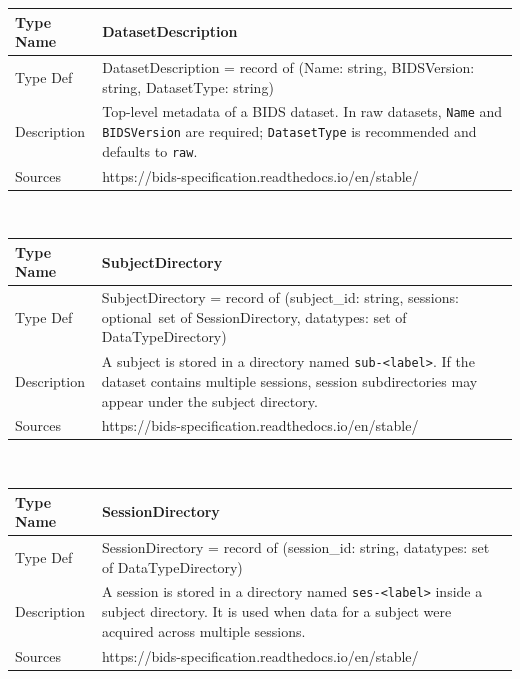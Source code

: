 \documentclass[12pt]{article}
\newcommand{\colAwidth}{0.13\textwidth}
\newcommand{\colBwidth}{0.82\textwidth}
\begin{document}
\noindent
\begin{minipage}{\textwidth}
\renewcommand*{\arraystretch}{1.5}
\begin{tabular}{| p{\colAwidth} | p{\colBwidth}|}
  \hline
  \rowcolor[gray]{0.9}
  Type Name & DatasetDescription\\
  \hline
  Type Def & DatasetDescription = record of (Name: string, BIDSVersion: string, DatasetType: string)\\
  \hline
  Description & Top-level metadata of a BIDS dataset. In raw datasets, \texttt{Name} and \texttt{BIDSVersion} are required; \texttt{DatasetType} is recommended and defaults to \texttt{raw}.\\
  \hline
  Sources & https://bids-specification.readthedocs.io/en/stable/\\
  \hline
\end{tabular}
\end{minipage}\\

\noindent
\begin{minipage}{\textwidth}
\renewcommand*{\arraystretch}{1.5}
\begin{tabular}{| p{\colAwidth} | p{\colBwidth}|}
  \hline
  \rowcolor[gray]{0.9}
  Type Name & SubjectDirectory\\
  \hline
  Type Def & SubjectDirectory = record of (subject\_id: string, sessions: optional~set of SessionDirectory, datatypes: set of DataTypeDirectory)\\
  \hline
  Description & A subject is stored in a directory named \texttt{sub-<label>}. If the dataset contains multiple sessions, session subdirectories may appear under the subject directory.\\
  \hline
  Sources & https://bids-specification.readthedocs.io/en/stable/\\
  \hline
\end{tabular}
\end{minipage}\\

\noindent
\begin{minipage}{\textwidth}
\renewcommand*{\arraystretch}{1.5}
\begin{tabular}{| p{\colAwidth} | p{\colBwidth}|}
  \hline
  \rowcolor[gray]{0.9}
  Type Name & SessionDirectory\\
  \hline
  Type Def & SessionDirectory = record of (session\_id: string, datatypes: set of DataTypeDirectory)\\
  \hline
  Description & A session is stored in a directory named \texttt{ses-<label>} inside a subject directory. It is used when data for a subject were acquired across multiple sessions.\\
  \hline
  Sources & https://bids-specification.readthedocs.io/en/stable/\\
  \hline
\end{tabular}
\end{minipage}\\
\end{document}
